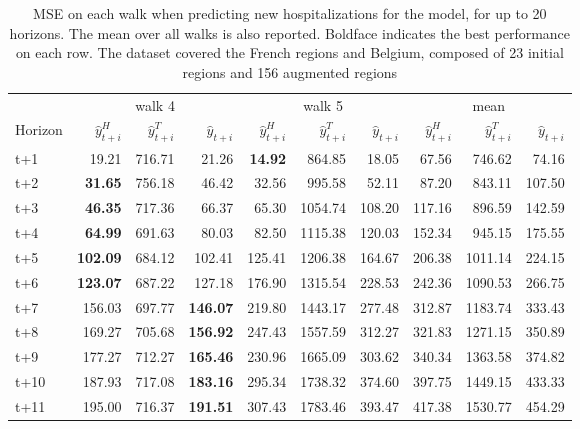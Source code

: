 \begin{table}[H]
\centering
\caption{MSE on each walk when predicting new hospitalizations for the model, for up to 20 horizons. The mean over all walks is also reported. Boldface indicates the best performance on each row. The dataset covered the French regions and Belgium, composed of 23 initial regions and 156 augmented regions }
\label{tab:MSE_walk_assemble}
\begin{tabular}{lrrrrrrrrr}
\toprule
 & \multicolumn{3}{c}{walk 4} & \multicolumn{3}{c}{walk 5} & \multicolumn{3}{c}{mean} 
\\

\cmidrule(lr){2-4} \cmidrule(lr){5-7} \cmidrule(lr){8-10} 
Horizon & $\hat{y}_{t+i}^H$ & $\hat{y}_{t+i}^T$ & $\hat{y}_{t+i}$ & $\hat{y}_{t+i}^H$ & $\hat{y}_{t+i}^T$ & $\hat{y}_{t+i}$ & $\hat{y}_{t+i}^H$ & $\hat{y}_{t+i}^T$ & $\hat{y}_{t+i}$ \\
\midrule
t+1  & 19.21  & 716.71  & 21.26  & \textbf{14.92}  & 864.85  & 18.05  & 67.56  & 746.62  & 74.16  \\
t+2  & \textbf{31.65}  & 756.18  & 46.42  & 32.56  & 995.58  & 52.11  & 87.20  & 843.11  & 107.50  \\
t+3  & \textbf{46.35}  & 717.36  & 66.37  & 65.30  & 1054.74  & 108.20  & 117.16  & 896.59  & 142.59  \\
t+4  & \textbf{64.99}  & 691.63  & 80.03  & 82.50  & 1115.38  & 120.03  & 152.34  & 945.15  & 175.55  \\
t+5  & \textbf{102.09}  & 684.12  & 102.41  & 125.41  & 1206.38  & 164.67  & 206.38  & 1011.14  & 224.15  \\
t+6  & \textbf{123.07}  & 687.22  & 127.18  & 176.90  & 1315.54  & 228.53  & 242.36  & 1090.53  & 266.75  \\
t+7  & 156.03  & 697.77  & \textbf{146.07}  & 219.80  & 1443.17  & 277.48  & 312.87  & 1183.74  & 333.43  \\
t+8  & 169.27  & 705.68  & \textbf{156.92}  & 247.43  & 1557.59  & 312.27  & 321.83  & 1271.15  & 350.89  \\
t+9  & 177.27  & 712.27  & \textbf{165.46}  & 230.96  & 1665.09  & 303.62  & 340.34  & 1363.58  & 374.82  \\
t+10  & 187.93  & 717.08  & \textbf{183.16}  & 295.34  & 1738.32  & 374.60  & 397.75  & 1449.15  & 433.33  \\
t+11  & 195.00  & 716.37  & \textbf{191.51}  & 307.43  & 1783.46  & 393.47  & 417.38  & 1530.77  & 454.29  \\

\end{tabular}
\end{table}
